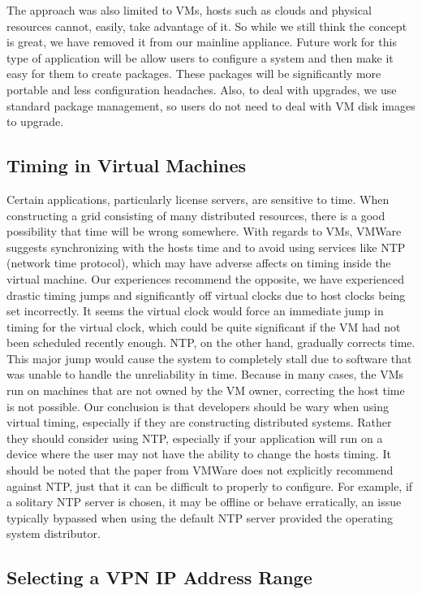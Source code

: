 \documentclass[conference]{IEEEtran}
\begin{document}
The approach was also limited to VMs, hosts such as clouds and physical
resources cannot, easily, take advantage of it.  So while we still think the
concept is great, we have removed it from our mainline appliance.  Future work
for this type of application will be allow users to configure a system and then
make it easy for them to create packages.  These packages will be significantly
more portable and less configuration headaches.  Also, to deal with upgrades,
we use standard package management, so users do not need to deal with VM disk
images to upgrade.

\subsection{Timing in Virtual Machines}

Certain applications, particularly license servers, are sensitive to time.
When constructing a grid consisting of many distributed resources, there is a
good possibility that time will be wrong somewhere.  With regards to VMs,
VMWare~\cite{vmware_timing} suggests synchronizing with the hosts time and to
avoid using services like NTP (network time protocol), which may have adverse
affects on timing inside the virtual machine.  Our experiences recommend the
opposite, we have experienced drastic timing jumps and significantly off
virtual clocks due to host clocks being set incorrectly.  It seems the virtual
clock would force an immediate jump in timing for the virtual clock, which
could be quite significant if the VM had not been scheduled recently enough.
NTP, on the other hand, gradually corrects time.  This major jump would cause
the system to completely stall due to software that was unable to handle the
unreliability in time.  Because in many cases, the VMs run on machines that are
not owned by the VM owner, correcting the host time is not possible.  Our
conclusion is that developers should be wary when using virtual timing,
especially if they are constructing distributed systems.  Rather they should
consider using NTP, especially if your application will run on a device where
the user may not have the ability to change the hosts timing.  It should be
noted that the paper from VMWare does not explicitly recommend against NTP,
just that it can be difficult to properly to configure.  For example, if a
solitary NTP server is chosen, it may be offline or behave erratically, an
issue typically bypassed when using the default NTP server provided the
operating system distributor.

\subsection{Selecting a VPN IP Address Range}
\end{document}
